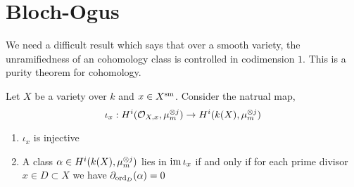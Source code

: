 \documentclass[12pt]{article}
\begin{document}
\section{Bloch-Ogus}

We need a difficult result which says that over a smooth variety, the unramifiedness of an \etale cohomology class is controlled in codimension $1$. This is a purity theorem for \etale cohomology.

\begin{theorem}
Let $X$ be a variety over $k$ and $x \in X^{\mathrm{sm}}$. Consider the natrual map,
\[ \iota_x : H^i(\mathcal{O}_{X, x}, \mu_m^{\otimes j}) \to H^i(k(X), \mu_m^{\otimes j}) \]
\begin{enumerate}
\item  $\iota_x$ is injective

\item A class $\alpha \in H^i(k(X), \mu_m^{\otimes j})$ lies in $\operatorname{\mathrm{im}}{\iota_x}$ if and only if for each prime divisor $x \in D \subset X$ we have $\partial_{\operatorname{\mathrm{ord}}_D}(\alpha) = 0$
\end{enumerate}
\end{theorem}
\end{document}
